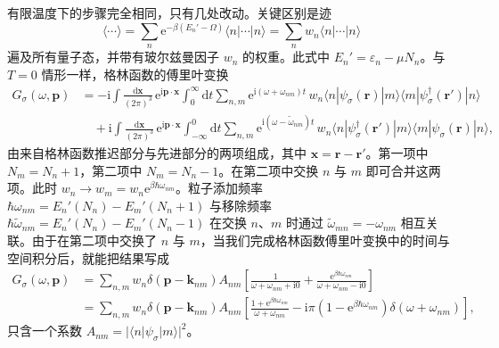有限温度下的步骤完全相同，只有几处改动。关键区别是迹
\begin{equation*}
\langle\cdots\rangle=\sum_{n}\mathrm{e}^{-\beta(E_{n}'-\Omega)}\langle n|\cdots|n\rangle=\sum_{n}w_{n}\langle n|\cdots|n\rangle\tag{7.74}
\end{equation*}
遍及所有量子态，并带有玻尔兹曼因子 $w_{n}$ 的权重。此式中 $E_{n}'=\varepsilon_{n}-\mu N_{n}$。与 $T=0$ 情形一样，格林函数的傅里叶变换
\begin{equation*}
\begin{aligned}
G_{\sigma}(\omega,\mathbf{p})&=-\mathrm{i}\int\frac{\mathrm{d}\mathbf{x}}{(2\pi)^{3}}\,\mathrm{e}^{\mathrm{i}\mathbf{p}\cdot\mathbf{x}}\int_{0}^{\infty}\mathrm{d}t\sum_{n,m}\mathrm{e}^{\mathrm{i}(\omega+\omega_{nm})t}\,w_{n}\langle n|\psi_{\sigma}(\mathbf{r})|m\rangle\langle m|\psi_{\sigma}^{\dagger}(\mathbf{r}')|n\rangle\\
&\quad+\mathrm{i}\int\frac{\mathrm{d}\mathbf{x}}{(2\pi)^{3}}\,\mathrm{e}^{\mathrm{i}\mathbf{p}\cdot\mathbf{x}}\int_{-\infty}^{0}\mathrm{d}t\sum_{n,m}\mathrm{e}^{\mathrm{i}(\omega-\tilde{\omega}_{nm})t}\,w_{n}\langle n|\psi_{\sigma}^{\dagger}(\mathbf{r}')|m\rangle\langle m|\psi_{\sigma}(\mathbf{r})|n\rangle,
\end{aligned}\tag{7.75}
\end{equation*}
由来自格林函数推迟部分与先进部分的两项组成，其中 $\mathbf{x}=\mathbf{r}-\mathbf{r}'$。第一项中 $N_{m}=N_{n}+1$，第二项中 $N_{m}=N_{n}-1$。在第二项中交换 $n$ 与 $m$ 即可合并这两项。此时 $w_{n}\to w_{m}=w_{n}\mathrm{e}^{\beta\hbar\omega_{nm}}$。粒子添加频率 $\hbar\omega_{nm}=E_{n}'(N_{n})-E_{m}'(N_{n}+1)$ 与移除频率 $\hbar\tilde{\omega}_{nm}=E_{n}'(N_{n})-E_{m}'(N_{n}-1)$ 在交换 $n$、$m$ 时通过 $\tilde{\omega}_{mn}=-\omega_{nm}$ 相互关联。由于在第二项中交换了 $n$ 与 $m$，当我们完成格林函数傅里叶变换中的时间与空间积分后，就能把结果写成
\begin{equation*}
\begin{aligned}
G_{\sigma}(\omega,\mathbf{p})&=\sum_{n,m}w_{n}\delta(\mathbf{p}-\mathbf{k}_{nm})A_{nm}\left[\frac{1}{\omega+\omega_{nm}+\mathrm{i}0}+\frac{\mathrm{e}^{\beta\hbar\omega_{nm}}}{\omega+\omega_{nm}-\mathrm{i}0}\right]\\
&=\sum_{n,m}w_{n}\delta(\mathbf{p}-\mathbf{k}_{nm})A_{nm}\left[\frac{1+\mathrm{e}^{\beta\hbar\omega_{nm}}}{\omega+\omega_{nm}}-\mathrm{i}\pi\left(1-\mathrm{e}^{\beta\hbar\omega_{nm}}\right)\delta(\omega+\omega_{nm})\right],
\end{aligned}\tag{7.76}
\end{equation*}
只含一个系数 $A_{nm}=|\langle n|\psi_{\sigma}|m\rangle|^{2}$。

